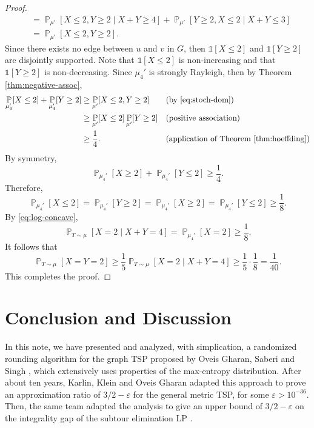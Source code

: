 \documentclass[letterpaper, reqno,12pt]{article}
\newcommand{\PP}{\mathop{{}\mathbb{P}}}
\begin{document}
\begin{proof}
\begin{align}
    &= \PP_{\mu'}[X \leq 2, Y \geq 2 \mid X + Y \geq 4] + \PP_{\mu'}[Y \geq 2, X \leq 2 \mid X + Y \leq 3] \nonumber \\
    &= \PP_{\mu'}[X \leq 2, Y \geq 2]. \label{eq:stoch-dom}
  \end{align}
  Since there exists no edge between $u$ and $v$ in $G$, then $\mathds 1[X \leq 2]$ and $\mathds 1[Y \geq 2]$ are disjointly supported. Note that $\mathds 1[X \leq 2]$ is non-increasing and that $\mathds 1[Y \geq 2]$ is non-decreasing. Since $\mu_4'$ is strongly Rayleigh, then by Theorem \ref{thm:negative-assoc},
  \begin{align*}
    \PP_{\mu_4'}[X \leq 2] + \PP_{\mu_4'}[Y \geq 2] &\geq \PP_{\mu'}[X \leq 2, Y \geq 2] && \text{(by \eqref{eq:stoch-dom})} \\
    &\geq \PP_{\mu'}[X \leq 2] \PP_{\mu'}[Y \geq 2] && \text{(positive association)} \\
    &\geq \frac{1}{4}. && \text{(application of Theorem \ref{thm:hoeffding})}
  \end{align*}
  By symmetry,
  $$ \PP_{\mu_4'}[X \geq 2] + \PP_{\mu_4'}[Y \leq 2] \geq \frac{1}{4}. $$
  Therefore,
  $$ \PP_{\mu_4'}[X \leq 2] = \PP_{\mu_4'}[Y \geq 2] = \PP_{\mu_4'}[X \geq 2] = \PP_{\mu_4'}[Y \leq 2] \geq \frac{1}{8}. $$
  By \eqref{eq:log-concave},
  $$ \PP_{T \sim \mu}[X = 2 \mid X + Y = 4] = \PP_{\mu_4'}[X = 2] \geq \frac{1}{8}. $$
  It follows that
  $$ \PP_{T \sim \mu}[X = Y = 2] \geq \frac{1}{5} \PP_{T \sim \mu}[X = 2 \mid X + Y = 4] \geq \frac{1}{5} \cdot \frac{1}{8} = \frac{1}{40}. $$
  This completes the proof.
\end{proof}

\section{Conclusion and Discussion}

In this note, we have presented and analyzed, with simplication, a randomized rounding algorithm for the graph TSP proposed by Oveis Gharan, Saberi and Singh \cite{gharan2011randomized}, which extensively uses properties of the max-entropy distribution. After about ten years, Karlin, Klein and Oveis Gharan \cite{karlin2021slightly} adapted this approach to prove an approximation ratio of $3/2 - \varepsilon$ for the general metric TSP, for some $\varepsilon > 10^{-36}$. Then, the same team adapted the analysis to give an upper bound of $3/2 - \varepsilon$ on the integrality gap of the subtour elimination LP \cite{karlin2021slightlyig}.
\end{document}
